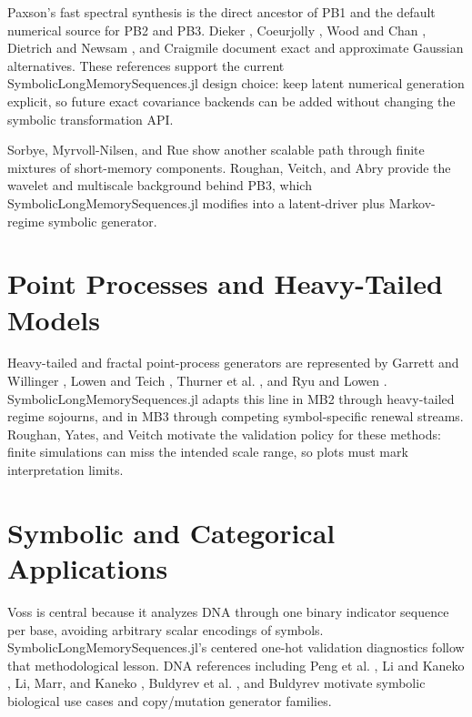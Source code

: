 \documentclass[11pt]{article}
\begin{document}
Paxson's fast spectral synthesis \cite{paxson1997_fast} is the direct ancestor
of PB1 and the default numerical source for PB2 and PB3. Dieker
\cite{dieker2004_simulation}, Coeurjolly \cite{coeurjolly2000_simulation},
Wood and Chan \cite{wood1994_simulation}, Dietrich and Newsam
\cite{dietrich1997_fast}, and Craigmile \cite{craigmile2000_simulating}
document exact and approximate Gaussian alternatives. These references support
the current SymbolicLongMemorySequences.jl design choice: keep latent numerical generation explicit, so
future exact covariance backends can be added without changing the symbolic
transformation API.

Sorbye, Myrvoll-Nilsen, and Rue \cite{sorbye2017_an} show another scalable path
through finite mixtures of short-memory components. Roughan, Veitch, and Abry
\cite{roughan2000_real} provide the wavelet and multiscale background behind
PB3, which SymbolicLongMemorySequences.jl modifies into a latent-driver plus Markov-regime symbolic
generator.

\section{Point Processes and Heavy-Tailed Models}

Heavy-tailed and fractal point-process generators are represented by Garrett and
Willinger \cite{garrett1994_analysis}, Lowen and Teich
\cite{lowen1995_estimation}, Thurner et al. \cite{thurner1997_analysis}, and
Ryu and Lowen \cite{ryu1998_point}. SymbolicLongMemorySequences.jl adapts this line in MB2 through
heavy-tailed regime sojourns, and in MB3 through competing symbol-specific
renewal streams. Roughan, Yates, and Veitch \cite{roughan1999_the} motivate the
validation policy for these methods: finite simulations can miss the intended
scale range, so plots must mark interpretation limits.

\section{Symbolic and Categorical Applications}

Voss \cite{voss1992_evolution} is central because it analyzes DNA through one
binary indicator sequence per base, avoiding arbitrary scalar encodings of
symbols. SymbolicLongMemorySequences.jl's centered one-hot validation diagnostics follow that
methodological lesson. DNA references including Peng et al.
\cite{peng1992_long}, Li and Kaneko \cite{li1992_long}, Li, Marr, and Kaneko
\cite{li1994_understanding}, Buldyrev et al. \cite{buldyrev1998_analysis}, and
Buldyrev \cite{buldyrev2006_power} motivate symbolic biological use cases and
copy/mutation generator families.
\end{document}
